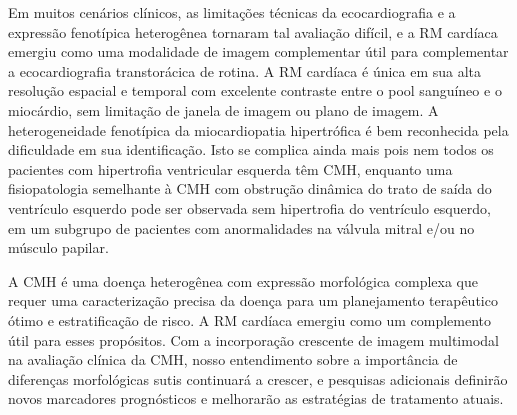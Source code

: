 Em muitos cenários clínicos, as limitações técnicas da ecocardiografia e a expressão fenotípica heterogênea tornaram tal avaliação difícil, e a RM cardíaca emergiu como uma modalidade de imagem complementar útil para complementar a ecocardiografia transtorácica de rotina. A RM cardíaca é única em sua alta resolução espacial e temporal com excelente contraste entre o pool sanguíneo e o miocárdio, sem limitação de janela de imagem ou plano de imagem.
A heterogeneidade fenotípica da miocardiopatia hipertrófica é bem reconhecida pela dificuldade em sua identificação. Isto se complica ainda mais pois nem todos os pacientes com hipertrofia ventricular esquerda têm CMH, enquanto uma fisiopatologia semelhante à CMH com obstrução dinâmica do trato de saída do ventrículo esquerdo pode ser observada sem hipertrofia do ventrículo esquerdo, em um subgrupo de pacientes com anormalidades na válvula mitral e/ou no músculo papilar.

A CMH é uma doença heterogênea com expressão morfológica complexa que requer uma caracterização precisa da doença para um planejamento terapêutico ótimo e estratificação de risco. A RM cardíaca emergiu como um complemento útil para esses propósitos. Com a incorporação crescente de imagem multimodal na avaliação clínica da CMH, nosso entendimento sobre a importância de diferenças morfológicas sutis continuará a crescer, e pesquisas adicionais definirão novos marcadores prognósticos e melhorarão as estratégias de tratamento atuais\cite{toCardiacMagneticResonance2011c}.






